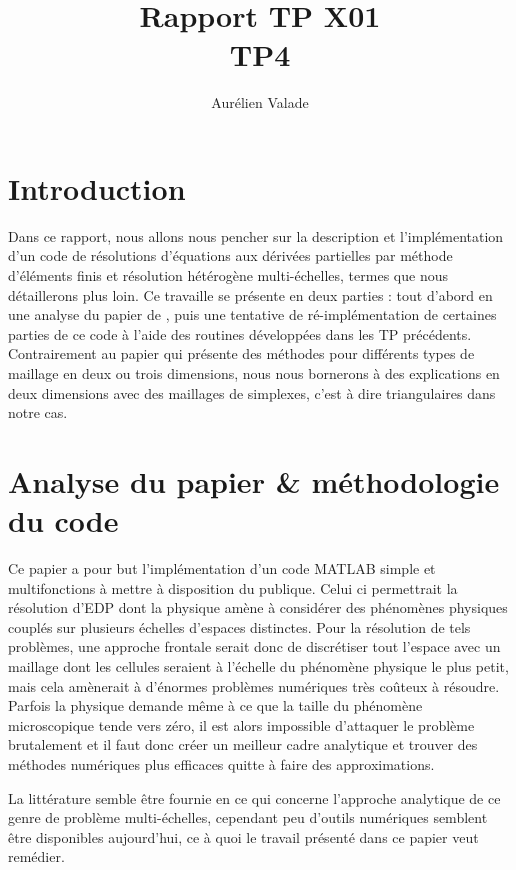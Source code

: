 \documentclass[11pt]{article}
\title{Rapport TP X01 \\ TP4}
\author{Aurélien Valade}
\date{}
\begin{document}
\maketitle

\section{Introduction}

Dans ce rapport, nous allons nous pencher sur la description et l'implémentation d'un code de résolutions d'équations aux dérivées partielles par méthode
d'éléments finis et résolution hétérogène multi-échelles, termes que nous détaillerons plus loin. Ce travaille se présente en deux parties : tout d'abord
en une analyse du papier de \cite{abdulle2009short}, puis une tentative de ré-implémentation de certaines parties de ce code à l'aide des routines développées
dans les TP précédents. Contrairement au papier qui présente des méthodes pour différents types de maillage en deux ou trois dimensions, nous nous
bornerons à des explications en deux dimensions avec des maillages de simplexes, c'est à dire triangulaires dans notre cas. 

\section{Analyse du papier \& méthodologie du code}

Ce papier a pour but l'implémentation d'un code MATLAB simple et multifonctions à mettre à disposition du publique. Celui ci permettrait la résolution
d'EDP dont la physique amène à considérer des phénomènes physiques couplés sur plusieurs échelles d'espaces distinctes. Pour la résolution de tels
problèmes, une approche frontale serait donc de discrétiser tout l'espace avec un maillage dont les cellules seraient à l'échelle du phénomène physique le
plus petit, mais cela amènerait à d'énormes problèmes numériques très coûteux à résoudre. Parfois la physique demande même à ce que la taille du phénomène
microscopique tende vers zéro, il est alors impossible d'attaquer le problème brutalement et il faut donc créer un meilleur cadre analytique et trouver
des méthodes numériques plus efficaces quitte à faire des approximations.

La littérature semble être fournie en ce qui concerne l'approche analytique de ce genre de problème multi-échelles, cependant peu d'outils numériques
semblent être disponibles aujourd'hui, ce à quoi le travail présenté dans ce papier veut remédier. 
\end{document}
